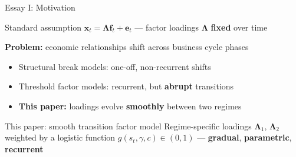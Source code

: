 \documentclass{beamer}
\begin{document}
\begin{frame}{Essay I: Motivation}

\begin{block}{Standard assumption}
  $\boldsymbol{x}_t = \boldsymbol{\Lambda}\boldsymbol{f}_t + \boldsymbol{e}_t$ \quad --- \quad factor loadings $\boldsymbol{\Lambda}$ \textbf{fixed} over time
\end{block}

\vspace{0.7em}

\textbf{Problem:} economic relationships shift across business cycle phases

\vspace{0.3em}
\begin{itemize}
  \item Structural break models: one-off, non-recurrent shifts
  \item Threshold factor models: recurrent, but \textbf{abrupt} transitions
  \item[\textcolor{isegblue}{$\Rightarrow$}] \textcolor{isegblue}{\textbf{This paper:}} loadings evolve \textbf{smoothly} between two regimes
\end{itemize}

\vspace{0.7em}

\begin{block}{This paper: smooth transition factor model}
  Regime-specific loadings $\boldsymbol{\Lambda}_1$, $\boldsymbol{\Lambda}_2$ weighted by a logistic function
  $g(s_t,\gamma,c)\in(0,1)$ — \textbf{gradual}, \textbf{parametric}, \textbf{recurrent}
\end{block}

\end{frame}
\end{document}
